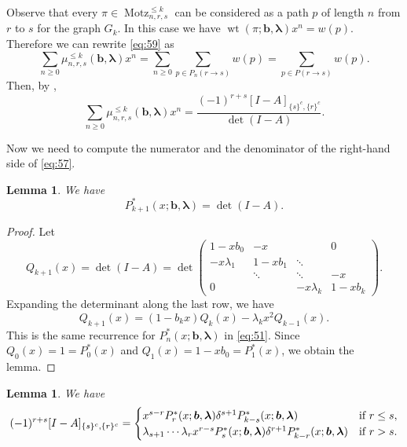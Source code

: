 \documentclass[oneside]{book}
\numberwithin{equation}{section}
\newtheorem{lem}[thm]{Lemma}
\theoremstyle{definition}
\newcommand\Motz{\operatorname{Motz}}
\newcommand\wt{\operatorname{wt}}
\renewcommand\vec[1]{\bm{#1}}
\newcommand\vb{\vec{b}}
\newcommand\vla{\vec{\lambda}}
\begin{document}
Observe that every \( \pi\in \Motz^{\le k}_{n,r,s} \) can be
considered as a path \( p \) of length \( n \) from \( r \) to \( s \)
for the graph \( G_k \). In this case we have
\( \wt(\pi;\vb,\vla)x^n = w(p) \). Therefore we can rewrite \eqref{eq:59}
as
\begin{equation}\label{eq:60}
  \sum_{n\ge0} \mu_{n,r,s}^{\le k}(\vb,\vla) x^n
  = \sum_{n\ge0 }  \sum_{p\in P_n(r\to s)} w(p)
  = \sum_{p\in P(r\to s)}  w(p).
\end{equation}
Then, by ,
\begin{equation}\label{eq:57}
  \sum_{n\ge0} \mu_{n,r,s}^{\le k}(\vb,\vla) x^n
  = \frac{(-1)^{r+s} [I-A]_{\{s\}^c,\{r\}^c}}{\det(I-A)}.
\end{equation}

Now we need to compute the numerator and the denominator of the
right-hand side of \eqref{eq:57}.


\begin{lem}\label{lem:6}
We have
  \[
    P^*_{k+1}(x;\vb,\vla) = \det (I - A).
\]
\end{lem}

\begin{proof}
Let 
  \[
 Q_{k+1}(x) = \det (I - A) = 
 \det
  \begin{pmatrix}
    1-xb_0 & -x &  & 0 \\
    -x\lambda_1 & 1-xb_1 & \ddots & \\
             & \ddots & \ddots & -x \\
   0  &  & -x\lambda_{k} & 1-xb_{k}
  \end{pmatrix}.
\]
Expanding the determinant along the last row, we have
\[
    Q_{k+1}(x) = (1-b_{k}x) Q_{k}(x) - \lambda_{k} x^2 Q_{k-1}(x).
\]
This is the same recurrence for \( P^*_n(x;\vb,\vla) \) in
\eqref{eq:51}. Since \( Q_0(x) = 1 = P^*_0(x) \) and
\( Q_1(x) = 1-xb_0 = P^*_1(x) \), we obtain the lemma.
\end{proof}


\begin{lem}\label{lem:7}
  We have
\[
  (-1)^{r+s} [I-A]_{\{s\}^c,\{r\}^c} =
  \begin{cases}
  x^{s-r} P^*_r(x;\vb,\vla) \delta^{s+1} P^*_{k-s}(x;\vb,\vla)  & \mbox{if \( r\le s \)},\\
    \lambda_{s+1} \cdots \lambda_r x^{r-s} P^*_s(x;\vb,\vla) \delta^{r+1} P^*_{k-r}(x;\vb,\vla)
    & \mbox{if \( r>s \).}
  \end{cases}
\]
\end{lem}
\end{document}
